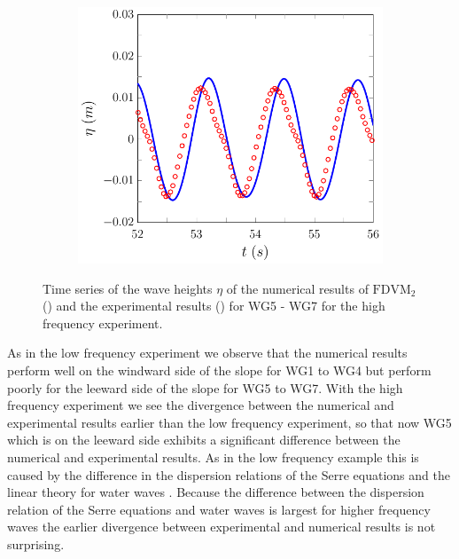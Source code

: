 \begin{figure}
\begin{subfigure}{0.5\textwidth}
		\vspace{0.5cm}
	\end{subfigure}
	\begin{subfigure}{0.5\textwidth}
		\includegraphics[width=\textwidth]{./chp6/figures/Experiment/Beji/sh/FDVMWG7.pdf}
		\vspace{0.5cm}
	\end{subfigure}
	\caption{Time series of the wave heights $\eta$ of the numerical results of $\text{FDVM}_2$ ({\color{blue}\solidrule}) and the experimental results () for WG5 - WG7 for the high frequency experiment.}
	\label{fig:BejishWG5to7FDVM}
\end{figure}

As in the low frequency experiment we observe that the numerical results perform well on the windward side of the slope for WG1 to WG4 but perform poorly for the leeward side of the slope for WG5 to WG7. With the high frequency experiment we see the divergence between the numerical and experimental results earlier than the low frequency experiment, so that now WG5 which is on the leeward side exhibits a significant difference between the numerical and experimental results. As in the low frequency example this is caused by the difference in the dispersion relations of the Serre equations and the linear theory for water waves \cite{Beji-Battjes-1994-1,Lannes-2013}. Because the difference between the dispersion relation of the Serre equations and water waves is largest for higher frequency waves \cite{Barthelemy-2004-315} the earlier divergence between experimental and numerical results is not surprising. 

